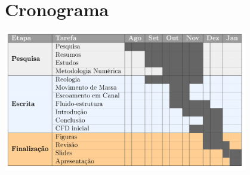 \section{Cronograma}

\begin{frame}
    \centering
    \includegraphics[width=0.8\textwidth]{images/cronograma.png}
\end{frame}